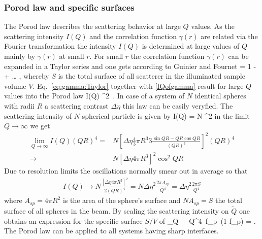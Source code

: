 \subsubsection{Porod law and specific surfaces}

The Porod law describes the scattering behavior at large $Q$ values.
As the scattering intensity $I(Q)$ and the correlation function $\gamma(r)$
are related via the Fourier transformation the intensity $I(Q)$ is determined
at large values of $Q$ mainly by $\gamma(r)$ at small $r$. For small $r$  the
correlation function $\gamma(r)$ can be expanded in a Taylor series and one
gets according to Guinier and Fournet \cite{book:Guinier:Fournet}
\BE
{} = 1 -  \,  + \dots
\quad ,
\label{eq:gamma:Taylor}
\EE
whereby $S$ is the total surface of all scatterer in the illuminated sample volume $V$.
Eq.\ \ref{eq:gamma:Taylor} together with \ref{IQofgamma} result for large
$Q$ values into the Porod law
\BE
I(Q) \longrightarrow \Delta\eta^2\,  .
\label{eq:Porodlaw}
\EE
In case of a system of $N$ identical spheres with radii $R$ a scattering contrast $\Delta \eta$ this law can be easily veryfied. The scattering intensity of $N$ spherical particle is given by
\BE
I(Q) = N ^2
\EE
in the limit $Q \rightarrow \infty$ we get
\begin{align}\label{eq:spherePorodLaw1}
  \lim_{Q \rightarrow \infty} I(Q) (QR)^4 = & N \left[ \Delta\eta  \frac{4}{3}\pi R^3 3 \frac{\sin QR - QR \cos QR}{(QR)^3}\right]^2 (QR)^4\\
    \rightarrow & N \left[\Delta\eta 4 \pi R^3 \right]^2 \cos^2 QR
\end{align}
Due to resolution limits the oscillations normally smear out in average so that
\begin{align}\label{eq:spherePorodLaw2}
I(Q) \rightarrow N\frac{\left[\Delta\eta 4\pi R^3 \right]^2 }{2 (QR)^4} = N \Delta\eta^2\frac{2\pi A_{sp}}{Q^4} =  \Delta\eta^2\frac{2\pi S}{Q^4}
\end{align}
where $A_{sp}=4\pi R^2$ is the area of the sphere's surface and $N A_{sp}=S$ the total surface of all spheres in the beam.
By scaling the scattering intensity on $\tilde Q$ one obtains an expression
for the specific surface $S/V$ of
\BE
\lim_{Q\rightarrow \infty} \, \pi\,\, Q^4\, f_p\,
(1-f_p) =  .
\label{eq:spez:surface}
\EE
The Porod law can be applied to all systems having sharp interfaces.


